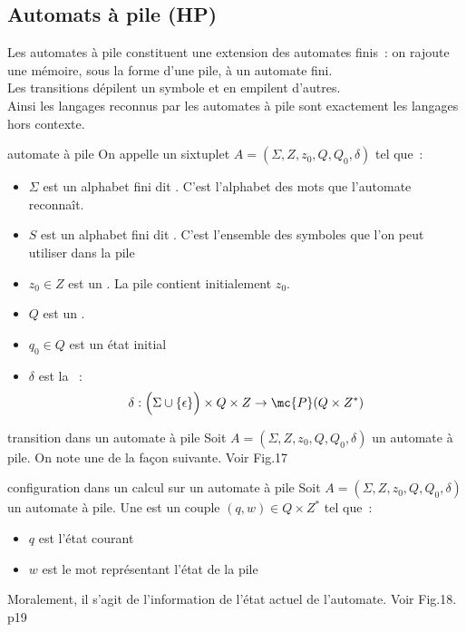 \begin{adjustwidth}{-3cm}{-3cm}
\section{Automats à pile (HP)}

Les automates à pile constituent une extension des automates finis~: on rajoute une mémoire, sous la forme d'une pile, à un automate fini.\\
Les transitions dépilent un symbole et en empilent d'autres.\\
Ainsi les langages reconnus par les automates à pile sont exactement les langages hors contexte.

\begin{definition}{}{automate à pile}
    On appelle  un sixtuplet $A = (\Sigma, Z, z_0, Q, Q_0, \delta)$ tel que~:
    \begin{itemize}
        \item $\Sigma$ est un alphabet fini dit . C'est l'alphabet des mots que l'automate reconnaît.
        \item $S$ est un alphabet fini dit . C'est l'ensemble des symboles que l'on peut utiliser dans la pile
        \item $z_0 \in Z$ est un . La pile contient initialement $z_0$.
        \item $Q$ est un .
        \item $q_0 \in Q$ est un état initial
        \item $\delta$ est la ~:
        $$\delta : \Big(\Sigma \cup \{\epsilon\}\Big)\times Q\times Z \to \mc{P}(Q\times Z^*)$$
    \end{itemize}
\end{definition}

\begin{definition}{}{transition dans un automate à pile}
    Soit $A = (\Sigma, Z, z_0, Q, Q_0, \delta)$ un automate à pile. On note une  de la façon suivante. Voir Fig.17
\end{definition}

\begin{definition}{}{configuration dans un calcul sur un automate à pile}
    Soit $A = (\Sigma, Z, z_0, Q, Q_0, \delta)$ un automate à pile. Une  est un couple $(q,w) \in Q \times Z^*$ tel que~:
    \begin{itemize}
        \item $q$ est l'état courant
        \item $w$ est le mot représentant l'état de la pile
    \end{itemize}
    Moralement, il s'agit de l'information de l'état actuel de l'automate.
    Voir Fig.18. p19
\end{definition}


\end{adjustwidth}
